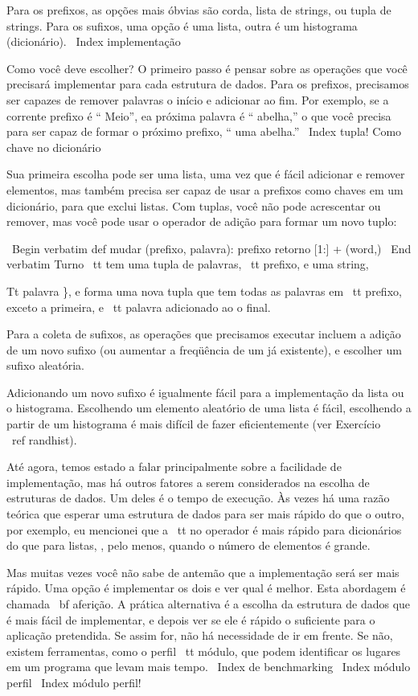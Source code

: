 \documentclass[10pt]{book}
\begin{document}
\begin {itemize}
{{{{{{{{{Para os prefixos, as opções mais óbvias são corda,
lista de strings, ou tupla de strings. Para os sufixos,
uma opção é uma lista, outra é um histograma (dicionário).
\ Index {implementação}

Como você deve escolher? O primeiro passo é pensar sobre
as operações que você precisará implementar para cada estrutura de dados.
Para os prefixos, precisamos ser capazes de remover palavras
o início e adicionar ao fim. Por exemplo, se a corrente
prefixo é `` Meio'', ea próxima palavra é `` abelha,'' o que você precisa
para ser capaz de formar o próximo prefixo, `` uma abelha.''
\ Index {tupla! Como chave no dicionário}

Sua primeira escolha pode ser uma lista, uma vez que é fácil adicionar
e remover elementos, mas também precisa ser capaz de usar a
prefixos como chaves em um dicionário, para que exclui listas.
Com tuplas, você não pode acrescentar ou remover, mas você pode usar
o operador de adição para formar um novo tuplo:

\ Begin {verbatim}
def mudar (prefixo, palavra):
    prefixo retorno [1:] + (word,)
\ End {verbatim}
%
{Turno \ tt} tem uma tupla de palavras, {\ tt prefixo}, e uma string, 
{Tt palavra \}, e forma uma nova tupla que tem todas as palavras
em {\ tt prefixo}, exceto a primeira, e {\ tt palavra} adicionado ao
o final.

Para a coleta de sufixos, as operações que precisamos
executar incluem a adição de um novo sufixo (ou aumentar a freqüência
de um já existente), e escolher um sufixo aleatória.

Adicionando um novo sufixo é igualmente fácil para a implementação da lista
ou o histograma. Escolhendo um elemento aleatório de uma lista
é fácil, escolhendo a partir de um histograma é mais difícil de fazer
eficientemente (ver Exercício ~ \ ref {randhist}).

Até agora, temos estado a falar principalmente sobre a facilidade de implementação,
mas há outros fatores a serem considerados na escolha de estruturas de dados.
Um deles é o tempo de execução. Às vezes há uma razão teórica que esperar
uma estrutura de dados para ser mais rápido do que o outro, por exemplo, eu mencionei
que a {\ tt no} operador é mais rápido para dicionários do que para listas,
, pelo menos, quando o número de elementos é grande.

Mas muitas vezes você não sabe de antemão que a implementação será
ser mais rápido. Uma opção é implementar os dois e ver qual
é melhor. Esta abordagem é chamada {\ bf aferição}. A prática
alternativa é a escolha da estrutura de dados que é
mais fácil de implementar, e depois ver se ele é rápido o suficiente para o
aplicação pretendida. Se assim for, não há necessidade de ir em frente. Se não,
existem ferramentas, como o perfil {\ tt} módulo, que podem identificar
os lugares em um programa que levam mais tempo.
\ Index {} de benchmarking
\ Index {módulo perfil}
\ Index {módulo perfil!}

}}}}}}}}}}
\end{itemize}
\end{document}
